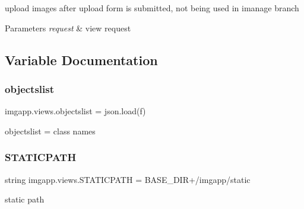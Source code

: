 upload images after upload form is submitted, not being used in imanage branch 


\begin{DoxyParams}{Parameters}
{\em request} & view request \\
\hline
\end{DoxyParams}


\subsection{Variable Documentation}
\mbox{\label{namespaceimgapp_1_1views_ace59bf1ee23e1e68ab25883a1ab83a07}} 
\subsubsection{\texorpdfstring{objectslist}{objectslist}}
{\footnotesize\ttfamily imgapp.\+views.\+objectslist = json.\+load(f)}



objectslist = class names 

\mbox{\label{namespaceimgapp_1_1views_ae3b2640fa382262bdf30df5509438d83}} 
\subsubsection{\texorpdfstring{S\+T\+A\+T\+I\+C\+P\+A\+TH}{STATICPATH}}
{\footnotesize\ttfamily string imgapp.\+views.\+S\+T\+A\+T\+I\+C\+P\+A\+TH = B\+A\+S\+E\+\_\+\+D\+IR+\textquotesingle{}/imgapp/static\textquotesingle{}}



static path 

